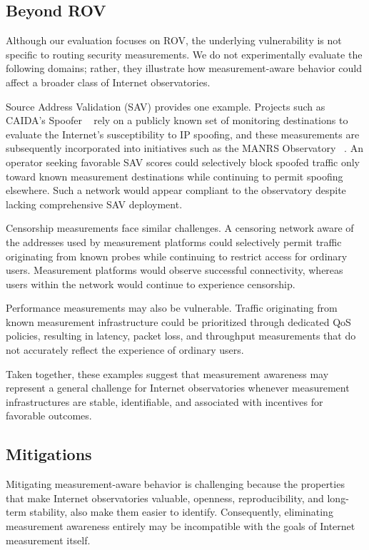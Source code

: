 \documentclass[sigconf, 10pt, anonymous, nonacm]{acmart}
\begin{document}
\subsection{Beyond ROV}

Although our evaluation focuses on ROV, the underlying vulnerability is not specific to routing security measurements. We do not experimentally evaluate the following domains; rather, they illustrate how measurement-aware behavior could affect a broader class of Internet observatories.

Source Address Validation (SAV) provides one example. Projects such as CAIDA's Spoofer ~\cite{spoofer} rely on a publicly known set of monitoring destinations to evaluate the Internet's susceptibility to IP spoofing, and these measurements are subsequently incorporated into initiatives such as the MANRS Observatory ~\cite{manrs,manrsmetric}. An operator seeking favorable SAV scores could selectively block spoofed traffic only toward known measurement destinations while continuing to permit spoofing elsewhere. Such a network would appear compliant to the observatory despite lacking comprehensive SAV deployment.

Censorship measurements face similar challenges. A censoring network aware of the addresses used by measurement platforms could selectively permit traffic originating from known probes while continuing to restrict access for ordinary users. Measurement platforms would observe successful connectivity, whereas users within the network would continue to experience censorship.

Performance measurements may also be vulnerable. Traffic originating from known measurement infrastructure could be prioritized through dedicated QoS policies, resulting in latency, packet loss, and throughput measurements that do not accurately reflect the experience of ordinary users.

Taken together, these examples suggest that measurement awareness may represent a general challenge for Internet observatories whenever measurement infrastructures are stable, identifiable, and associated with incentives for favorable outcomes.

\subsection{Mitigations}

Mitigating measurement-aware behavior is challenging because the properties that make Internet observatories valuable, openness, reproducibility, and long-term stability, also make them easier to identify. Consequently, eliminating measurement awareness entirely may be incompatible with the goals of Internet measurement itself.
\end{document}
